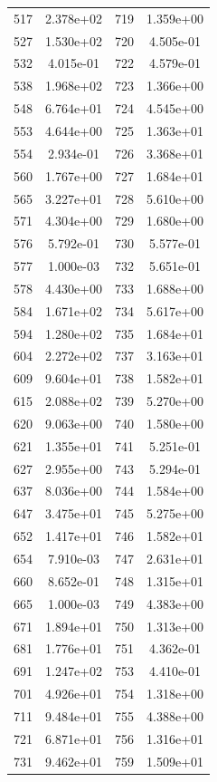 \documentclass[12pt]{article}
\begin{document}
\begin{longtable}{@{}cccc@{}}
517 & 2.378e+02 & 719 & 1.359e+00 \\
527 & 1.530e+02 & 720 & 4.505e-01 \\
532 & 4.015e-01 & 722 & 4.579e-01 \\
538 & 1.968e+02 & 723 & 1.366e+00 \\
548 & 6.764e+01 & 724 & 4.545e+00 \\
553 & 4.644e+00 & 725 & 1.363e+01 \\
554 & 2.934e-01 & 726 & 3.368e+01 \\
560 & 1.767e+00 & 727 & 1.684e+01 \\
565 & 3.227e+01 & 728 & 5.610e+00 \\
571 & 4.304e+00 & 729 & 1.680e+00 \\
576 & 5.792e-01 & 730 & 5.577e-01 \\
577 & 1.000e-03 & 732 & 5.651e-01 \\
578 & 4.430e+00 & 733 & 1.688e+00 \\
584 & 1.671e+02 & 734 & 5.617e+00 \\
594 & 1.280e+02 & 735 & 1.684e+01 \\
604 & 2.272e+02 & 737 & 3.163e+01 \\
609 & 9.604e+01 & 738 & 1.582e+01 \\
615 & 2.088e+02 & 739 & 5.270e+00 \\
620 & 9.063e+00 & 740 & 1.580e+00 \\
621 & 1.355e+01 & 741 & 5.251e-01 \\
627 & 2.955e+00 & 743 & 5.294e-01 \\
637 & 8.036e+00 & 744 & 1.584e+00 \\
647 & 3.475e+01 & 745 & 5.275e+00 \\
652 & 1.417e+01 & 746 & 1.582e+01 \\
654 & 7.910e-03 & 747 & 2.631e+01 \\
660 & 8.652e-01 & 748 & 1.315e+01 \\
665 & 1.000e-03 & 749 & 4.383e+00 \\
671 & 1.894e+01 & 750 & 1.313e+00 \\
681 & 1.776e+01 & 751 & 4.362e-01 \\
691 & 1.247e+02 & 753 & 4.410e-01 \\
701 & 4.926e+01 & 754 & 1.318e+00 \\
711 & 9.484e+01 & 755 & 4.388e+00 \\
721 & 6.871e+01 & 756 & 1.316e+01 \\
731 & 9.462e+01 & 759 & 1.509e+01 \\

\end{longtable}
\end{document}
